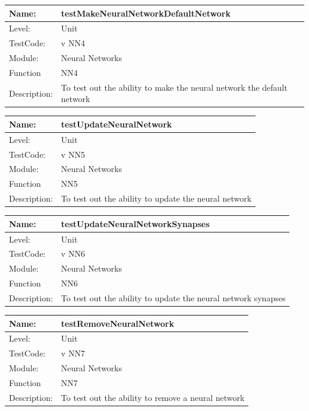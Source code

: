 \documentclass[12pt]{article}
\begin{document}
\begin{center}
\begin{tabular}{|l|p{12cm}|}
\hline

 Name: & testMakeNeuralNetworkDefaultNetwork \\
 \hline
Level: & Unit \\
\hline
TestCode: & v NN4 \\
\hline
Module:& Neural Networks \\
\hline
Function & NN4 \\
\hline
Description: & To test out the ability to make the neural network the default network  \\
\hline
\end{tabular}
\end{center}

\begin{center}
\begin{tabular}{|l|p{12cm}|}
\hline

 Name: & testUpdateNeuralNetwork \\
 \hline
Level: & Unit \\
\hline
TestCode: & v NN5 \\
\hline
Module:& Neural Networks \\
\hline
Function & NN5 \\
\hline
Description: & To test out the ability to update the neural network  \\
\hline
\end{tabular}
\end{center}

\begin{center}
\begin{tabular}{|l|p{12cm}|}
\hline

 Name: & testUpdateNeuralNetworkSynapses \\
 \hline
Level: & Unit \\
\hline
TestCode: & v NN6 \\
\hline
Module:& Neural Networks \\
\hline
Function & NN6 \\
\hline
Description: & To test out the ability to update the neural network synapses  \\
\hline
\end{tabular}
\end{center}

\begin{center}
\begin{tabular}{|l|p{12cm}|}
\hline

 Name: & testRemoveNeuralNetwork \\
 \hline
Level: & Unit \\
\hline
TestCode: & v NN7 \\
\hline
Module:& Neural Networks \\
\hline
Function & NN7 \\
\hline
Description: & To test out the ability to remove a neural network   \\
\hline
\end{tabular}
\end{center}
\end{document}
